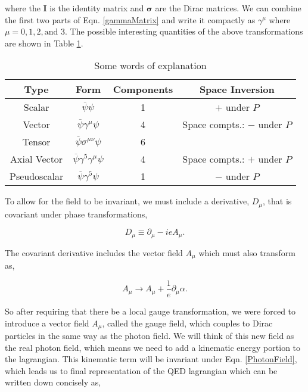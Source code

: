 where the $\boldsymbol{I}$ is the identity matrix and $\boldsymbol{\sigma}$ are the Dirac matrices. We can combine the first two parts of Eqn. \ref{gammaMatrix} and write it compactly as $\gamma^\mu$ where $\mu=0,1,2, \text{and }3$. The possible interesting quantities of the above transformations are shown in Table \ref{Transformations}.

\begin{table}
\centering
\begin{tabular}{|c|c|c|c|}
\hline
Type & Form & Components & Space Inversion \\
\hline
\hline
 Scalar &  $\overline{\psi}\psi$ &  1 & $+$ under $P$ \\
 Vector & $\overline{\psi}\gamma^\mu\psi$ & 4 & Space compts.: $-$ under $P$ \\
 Tensor & $\overline{\psi}\sigma^{\mu\nu}\psi$ & 6 &  \\
 Axial Vector & $\overline{\psi}\gamma^5\gamma^\mu\psi$ & 4 & Space compts.: $+$ under $P$ \\
 Pseudoscalar & $\overline{\psi}\gamma^5\psi$ & 1 & $-$ under $P$ \\
 \hline
\end{tabular}
\caption{Some words of explanation}
\label{Transformations}
\end{table}

To allow for the field to be invariant, we must include a derivative, $D_\mu$, that is covariant under phase transformations,
 
 \begin{equation}\label{QEDCovariantD}
 D_\mu\equiv\partial_\mu-ieA_\mu.
 \end{equation}
 
 The covariant derivative includes the vector field $A_\mu$ which must also transform as,
  
 \begin{equation}\label{PhotonField}
 A_\mu\rightarrow A_\mu+\frac{1}{e}\partial_\mu\alpha.
 \end{equation}
 
 So after requiring that there be a local gauge transformation, we were forced to introduce a vector field $A_\mu$, called the gauge field, which couples to Dirac particles in the same way as the photon field. We will think of this new field as the real photon field, which means we need to add a kinematic energy portion to the lagrangian. This kinematic term will be invariant under Eqn. \ref{PhotonField}, which leads us to final representation of the QED lagrangian which can be written down concisely as, 
 
